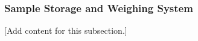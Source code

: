 
\subsubsection{Sample Storage and Weighing System}
\label{subsubsec:design_3_5_sample_storage_weighing_system}

[Add content for this subsection.]
